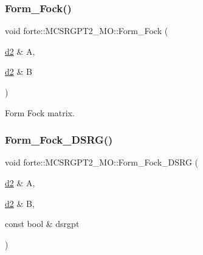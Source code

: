 \mbox{\label{classforte_1_1_m_c_s_r_g_p_t2___m_o_a7d6c590a53ea89304507133ebe778bce}} 
\subsubsection{\texorpdfstring{Form\+\_\+\+Fock()}{Form\_Fock()}}
{\footnotesize\ttfamily void forte\+::\+M\+C\+S\+R\+G\+P\+T2\+\_\+\+M\+O\+::\+Form\+\_\+\+Fock (\begin{DoxyParamCaption}\item[{\mbox{\hyperlink{mcsrgpt2__mo_8h_ae5de8a172a3b363a852d6d32e6d90537}{d2}} \&}]{A,  }\item[{\mbox{\hyperlink{mcsrgpt2__mo_8h_ae5de8a172a3b363a852d6d32e6d90537}{d2}} \&}]{B }\end{DoxyParamCaption})\hspace{0.3cm}{\ttfamily [protected]}}



Form Fock matrix. 

\mbox{\label{classforte_1_1_m_c_s_r_g_p_t2___m_o_aff036d2fcafadf0978399b23f6248695}} 
\subsubsection{\texorpdfstring{Form\+\_\+\+Fock\+\_\+\+D\+S\+R\+G()}{Form\_Fock\_DSRG()}}
{\footnotesize\ttfamily void forte\+::\+M\+C\+S\+R\+G\+P\+T2\+\_\+\+M\+O\+::\+Form\+\_\+\+Fock\+\_\+\+D\+S\+RG (\begin{DoxyParamCaption}\item[{\mbox{\hyperlink{mcsrgpt2__mo_8h_ae5de8a172a3b363a852d6d32e6d90537}{d2}} \&}]{A,  }\item[{\mbox{\hyperlink{mcsrgpt2__mo_8h_ae5de8a172a3b363a852d6d32e6d90537}{d2}} \&}]{B,  }\item[{const bool \&}]{dsrgpt }\end{DoxyParamCaption})\hspace{0.3cm}{\ttfamily [protected]}}

